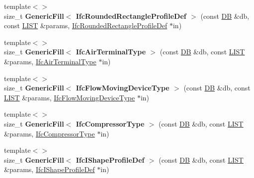 \begin{DoxyCompactItemize}
\item 
\hypertarget{namespace_assimp_1_1_s_t_e_p_a807c8fb5d34c1dae3adf27a06bc60ad6}{{\footnotesize template$<$$>$ }\\size\+\_\+t {\bfseries Generic\+Fill$<$ Ifc\+Rounded\+Rectangle\+Profile\+Def $>$} (const \hyperlink{class_assimp_1_1_s_t_e_p_1_1_d_b}{D\+B} \&db, const \hyperlink{class_assimp_1_1_s_t_e_p_1_1_e_x_p_r_e_s_s_1_1_l_i_s_t}{L\+I\+S\+T} \&params, \hyperlink{struct_assimp_1_1_i_f_c_1_1_ifc_rounded_rectangle_profile_def}{Ifc\+Rounded\+Rectangle\+Profile\+Def} $\ast$in)}\label{namespace_assimp_1_1_s_t_e_p_a807c8fb5d34c1dae3adf27a06bc60ad6}

\item 
\hypertarget{namespace_assimp_1_1_s_t_e_p_a2ed5c44c4dc51de3bfc5f3eca8413e6c}{{\footnotesize template$<$$>$ }\\size\+\_\+t {\bfseries Generic\+Fill$<$ Ifc\+Air\+Terminal\+Type $>$} (const \hyperlink{class_assimp_1_1_s_t_e_p_1_1_d_b}{D\+B} \&db, const \hyperlink{class_assimp_1_1_s_t_e_p_1_1_e_x_p_r_e_s_s_1_1_l_i_s_t}{L\+I\+S\+T} \&params, \hyperlink{struct_assimp_1_1_i_f_c_1_1_ifc_air_terminal_type}{Ifc\+Air\+Terminal\+Type} $\ast$in)}\label{namespace_assimp_1_1_s_t_e_p_a2ed5c44c4dc51de3bfc5f3eca8413e6c}

\item 
\hypertarget{namespace_assimp_1_1_s_t_e_p_a30aa2043978265f4abe35d7c9fcf1c64}{{\footnotesize template$<$$>$ }\\size\+\_\+t {\bfseries Generic\+Fill$<$ Ifc\+Flow\+Moving\+Device\+Type $>$} (const \hyperlink{class_assimp_1_1_s_t_e_p_1_1_d_b}{D\+B} \&db, const \hyperlink{class_assimp_1_1_s_t_e_p_1_1_e_x_p_r_e_s_s_1_1_l_i_s_t}{L\+I\+S\+T} \&params, \hyperlink{struct_assimp_1_1_i_f_c_1_1_ifc_flow_moving_device_type}{Ifc\+Flow\+Moving\+Device\+Type} $\ast$in)}\label{namespace_assimp_1_1_s_t_e_p_a30aa2043978265f4abe35d7c9fcf1c64}

\item 
\hypertarget{namespace_assimp_1_1_s_t_e_p_a6ce665f4250f9bebb33bb336543bbe4a}{{\footnotesize template$<$$>$ }\\size\+\_\+t {\bfseries Generic\+Fill$<$ Ifc\+Compressor\+Type $>$} (const \hyperlink{class_assimp_1_1_s_t_e_p_1_1_d_b}{D\+B} \&db, const \hyperlink{class_assimp_1_1_s_t_e_p_1_1_e_x_p_r_e_s_s_1_1_l_i_s_t}{L\+I\+S\+T} \&params, \hyperlink{struct_assimp_1_1_i_f_c_1_1_ifc_compressor_type}{Ifc\+Compressor\+Type} $\ast$in)}\label{namespace_assimp_1_1_s_t_e_p_a6ce665f4250f9bebb33bb336543bbe4a}

\item 
\hypertarget{namespace_assimp_1_1_s_t_e_p_a56e4be3e9e56e4b60753af3f128922c7}{{\footnotesize template$<$$>$ }\\size\+\_\+t {\bfseries Generic\+Fill$<$ Ifc\+I\+Shape\+Profile\+Def $>$} (const \hyperlink{class_assimp_1_1_s_t_e_p_1_1_d_b}{D\+B} \&db, const \hyperlink{class_assimp_1_1_s_t_e_p_1_1_e_x_p_r_e_s_s_1_1_l_i_s_t}{L\+I\+S\+T} \&params, \hyperlink{struct_assimp_1_1_i_f_c_1_1_ifc_i_shape_profile_def}{Ifc\+I\+Shape\+Profile\+Def} $\ast$in)}\label{namespace_assimp_1_1_s_t_e_p_a56e4be3e9e56e4b60753af3f128922c7}


\end{DoxyCompactItemize}
